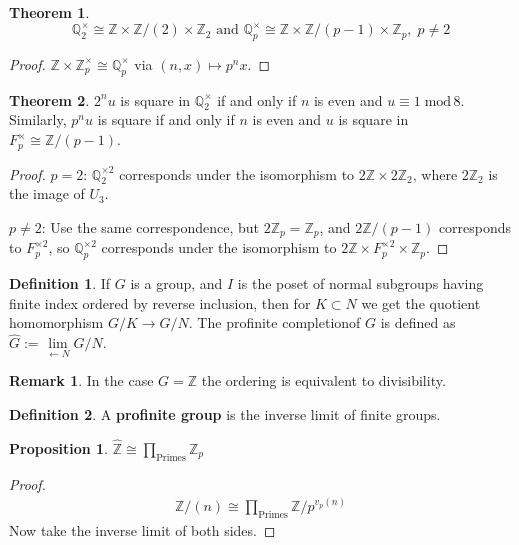 \documentclass[11pt]{article}
\theoremstyle{definition}
\newtheorem{defn}{Definition}
\newtheorem{thm}{Theorem}
\newtheorem{prop}{Proposition}
\newtheorem*{rmk}{Remark}
\newcommand{\tand}{\text{ and }}
\begin{document}
    \begin{thm}
        \[\mathbb{Q}_2^\times \cong \mathbb{Z}\times \mathbb{Z}/(2) \times \mathbb{Z}_2 \tand \mathbb{Q}_p^\times \cong \mathbb{Z} \times \mathbb{Z}/(p-1)\times \mathbb{Z}_p, \; p\neq 2\]
        \begin{proof}
            \(\mathbb{Z}\times \mathbb{Z}_p^\times \cong \mathbb{Q}_p^\times\) via \((n,x) \mapsto p^nx\).
        \end{proof}
    \end{thm}
    \begin{thm}
        \(2^nu\) is square in \(\mathbb{Q}_2^\times\) if and only if \(n\) is even and \(u \equiv 1 \;\text{mod}\,8\). Similarly, \(p^nu\) is square if and only if \(n\) is even and \(u\) is square in \(F_p^\times \cong \mathbb{Z}/(p-1)\).
        \begin{proof}
            \(p = 2\): \(\mathbb{Q}_2^{\times 2}\) corresponds under the isomorphism to \(2 \mathbb{Z} \times 2 \mathbb{Z}_2\), where \(2 \mathbb{Z}_2\) is the image of \(U_3\).

            \(p \neq 2\): Use the same correspondence, but \(2 \mathbb{Z}_p = \mathbb{Z}_p\), and \(2 \mathbb{Z}/(p-1)\) corresponds to \(F_p^{\times2}\), so \(\mathbb{Q}_p^{\times2}\) corresponds under the isomorphism to \(2 \mathbb{Z} \times F_p^{\times2} \times \mathbb{Z}_p\).
        \end{proof}
    \end{thm}
    \begin{defn}
        If \(G\) is a group, and \(I\) is the poset of normal subgroups having finite index ordered by reverse inclusion, then for \(K \subset N\) we get the quotient homomorphism \(G/K \to G/N\). The profinite completionof \(G\) is defined as \(\hat{G} := \lim\limits_{\longleftarrow N} G/N\).
    \end{defn}
    \begin{rmk}
        In the case \(G = \mathbb{Z}\) the ordering is equivalent to divisibility.
    \end{rmk}
    \begin{defn}\label{profinitegp}
        A \textbf{profinite group} is the inverse limit of finite groups.
    \end{defn}
    \begin{prop}
        \(\hat{\mathbb{Z}} \cong \prod_{\text{Primes}} \mathbb{Z}_p\)
        \begin{proof}
            \begin{align*}
                \mathbb{Z}/(n) \cong \prod_{\text{Primes}} \mathbb{Z}/p^{v_p(n)}
            \end{align*}
            Now take the inverse limit of both sides.
        \end{proof}
    \end{prop}
\end{document}
